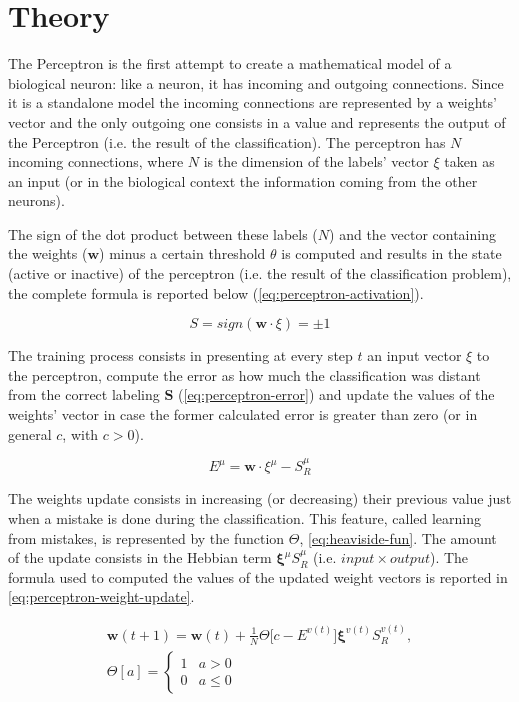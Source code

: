 \section{Theory}
\label{sec:fundamentals}
The Perceptron is the first attempt to create a mathematical model of a biological neuron:
like a neuron, it has incoming and outgoing connections.
Since it is a standalone model the incoming connections are represented by a weights' vector and the only outgoing one consists in a value and represents the output of the Perceptron (i.e. the result of the classification).
The perceptron has $N$ incoming connections, where $N$ is the dimension of the labels' vector $\xi$ taken as an input (or in the biological context the information coming from the other neurons).

The sign of the dot product between these labels ($N$) and the vector containing the weights ($\mathsf{\bm{w}}$) minus a certain threshold $\theta$ is computed and results in the state (active or inactive) of the perceptron (i.e. the result of the classification problem), the complete formula is reported below (\cref{eq:perceptron-activation}).

\begin{equation}
    S = sign(\mathsf{\bm{w}} \cdotp \xi) = \pm 1
    \label{eq:perceptron-activation}
\end{equation}

The training process consists in presenting at every step $t$ an input vector $\xi$ to the perceptron, compute the error as how much the classification was distant from the correct labeling $\bm{S}$ (\cref{eq:perceptron-error}) and update the values of the weights' vector in case the former calculated error is greater than zero (or in general $c$, with $c > 0$).

\begin{equation}
    \label{eq:perceptron-error}
    E^\mu = \mathsf{\bm{w}} \cdotp \xi^\mu - S^\mu_R
\end{equation}

The weights update consists in increasing (or decreasing) their previous value just when a mistake is done during the classification. This feature, called learning from mistakes,
is represented by the function $\Theta$, \cref{eq:heaviside-fun}. The amount of the update consists in the Hebbian term $\bm{\xi}^\mu S^\mu_R$ (i.e. $input \times output$).
The formula used to computed the values of the updated weight vectors is reported in \cref{eq:perceptron-weight-update}.

\begin{gather}
    \label{eq:perceptron-weight-update}
    \mathsf{\bm{w}}(t+1) = \mathsf{\bm{w}}(t) + \frac{1}{N} \Theta \big[c - E^{v(t)}\big] \bm{\xi}^{v(t)} S^{v(t)}_R, \\
    \Theta[a] =  \begin{cases} \label{eq:heaviside-fun}
        1 & a > 0 \\
        0 & a \leq 0 
    \end{cases}
\end{gather}

